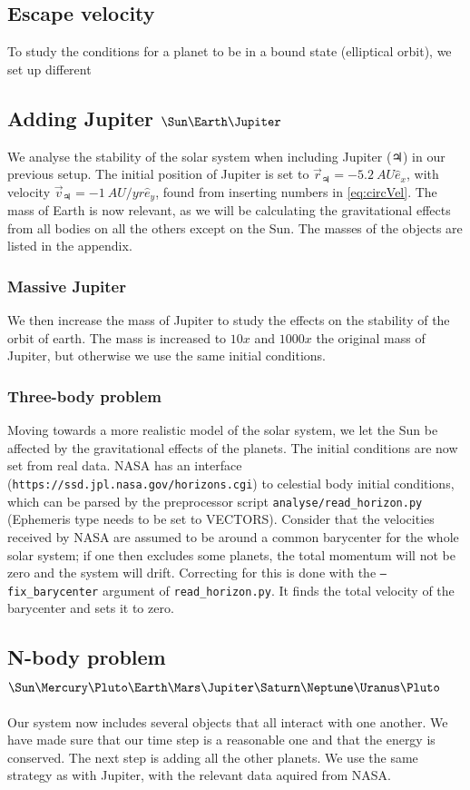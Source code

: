\documentclass[10pt]{article}
\begin{document}
\begin{multicols}{2}
\subsection{Escape velocity}
To study the conditions for a planet to be in a bound state (elliptical
orbit), we set up different 

\subsection{Adding Jupiter \texorpdfstring{$\Sun\Earth\Jupiter$}{}}
We analyse the stability of the solar system when including Jupiter
($\Jupiter$) in our previous setup. The initial position of Jupiter is set to
$\vec r_\Jupiter = -\SI{5.2}{AU}\hat e_x$, with velocity $\vec v_\Jupiter =
-\SI{1}{AU/yr}\hat e_y$, found from inserting numbers in \cref{eq:circVel}.
The mass of Earth is now relevant, as we will be calculating the
gravitational effects from all bodies on all the others except on the Sun.
The masses of the objects are listed in the appendix.

\subsubsection{Massive Jupiter }
We then increase the mass of Jupiter to study the effects on the stability
of the orbit of earth. The mass is increased to $10x$ and $1000x$ the
original mass of Jupiter, but otherwise we use the same initial conditions.

\subsubsection{Three-body problem} 
Moving towards a more realistic model of the solar system, we let the Sun
be affected by the gravitational effects of the planets. The initial
conditions are now set from real data. NASA 
has an interface (\texttt{https://ssd.jpl.nasa.gov/horizons.cgi}) to
celestial body initial conditions, which can be parsed by the preprocessor
script \texttt{analyse/read\_horizon.py} (Ephemeris type needs to be set to
VECTORS).  Consider that the velocities received by NASA are assumed to be
around a common barycenter for the whole solar system; if one then excludes
some planets, the total momentum will not be zero and the system will
drift.  
Correcting for this is done with the \texttt{--fix\_barycenter} argument of
\texttt{read\_horizon.py}. It finds the total velocity of the barycenter
and sets it to zero.


\subsection{N-body problem \texorpdfstring{$\Sun\Mercury\Pluto\Earth\Mars\Jupiter\Saturn\Neptune\Uranus\Pluto$}{}} 
Our system now includes several objects that all interact with one another.
We have made sure that our time step is a reasonable one and that the
energy is conserved. The next step is adding all the other planets. We use
the same strategy as with Jupiter, with the relevant data aquired from
NASA. 


\end{multicols}
\end{document}
